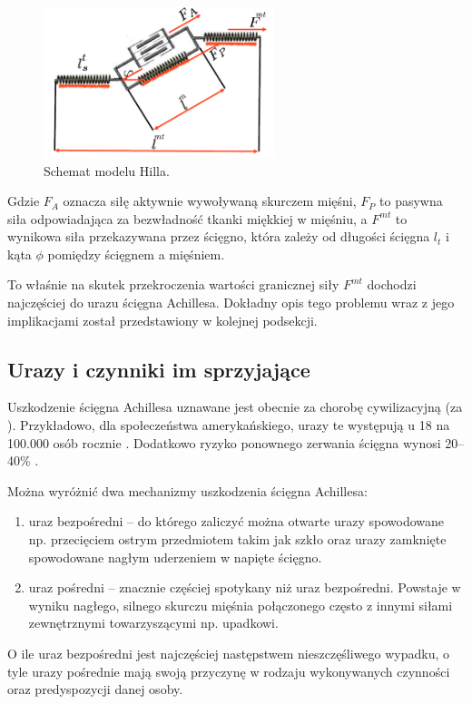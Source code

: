 \begin{figure}[h!]
	\centering
	\includegraphics[width=0.6\textwidth]{figures/Hill.png}
	\caption{Schemat modelu Hilla.}
	\label{hill-model}
\end{figure}

Gdzie $F_A$ oznacza siłę aktywnie wywoływaną skurczem mięśni, $F_P$ to pasywna siła odpowiadająca za bezwładność tkanki miękkiej w mięśniu, a $F^{mt}$ to wynikowa siła przekazywana przez ścięgno, która zależy od długości ścięgna $l_t$ i kąta $\phi$ pomiędzy ścięgnem a mięśniem. 

To właśnie na skutek przekroczenia wartości granicznej siły $F^{mt}$ dochodzi najczęściej do urazu ścięgna Achillesa. Dokładny opis tego problemu wraz z jego implikacjami został przedstawiony w kolejnej podsekcji.

\subsection{Urazy i czynniki im sprzyjające}

Uszkodzenie ścięgna Achillesa uznawane jest obecnie za chorobę cywilizacyjną (za \cite{Etiologia}). Przykładowo, dla społeczeństwa amerykańskiego, urazy te występują u 18 na 100.000 osób rocznie \cite{EpidemiologyUS}. Dodatkowo ryzyko ponownego zerwania ścięgna wynosi 20--40\% \cite{EpidemiologyUS}. 

Można wyróżnić dwa mechanizmy uszkodzenia ścięgna Achillesa: 
\begin{enumerate}
	\item uraz bezpośredni -- do którego zaliczyć można otwarte urazy spowodowane np. przecięciem ostrym przedmiotem takim jak szkło oraz urazy zamknięte spowodowane nagłym uderzeniem w napięte ścięgno.
	\item uraz pośredni -- znacznie częściej spotykany niż uraz bezpośredni. Powstaje w wyniku nagłego, silnego skurczu mięśnia połączonego często z innymi siłami zewnętrznymi towarzyszącymi np. upadkowi.
\end{enumerate}
O ile uraz bezpośredni jest najczęściej następstwem nieszczęśliwego wypadku, o tyle urazy pośrednie mają swoją przyczynę w rodzaju wykonywanych czynności oraz predyspozycji danej osoby. 

